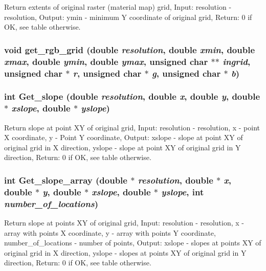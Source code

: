 Return extents of original raster (material map) grid, Input: resolution - resolution, Output: ymin - minimum Y coordinate of original grid, Return: 0 if OK, see table otherwise. 

\hypertarget{GisApi_8C_a18}{
\subsubsection[get\_\-rgb\_\-grid]{\setlength{\rightskip}{0pt plus 5cm}void get\_\-rgb\_\-grid (double {\em resolution}, double {\em xmin}, double {\em xmax}, double {\em ymin}, double {\em ymax}, unsigned char $\ast$$\ast$ {\em ingrid}, unsigned char $\ast$ {\em r}, unsigned char $\ast$ {\em g}, unsigned char $\ast$ {\em b})}}
\label{GisApi_8C_a18}


\hypertarget{GisApi_8C_a71}{
\subsubsection[Get\_\-slope]{\setlength{\rightskip}{0pt plus 5cm}int Get\_\-slope (double {\em resolution}, double {\em x}, double {\em y}, double $\ast$ {\em xslope}, double $\ast$ {\em yslope})}}
\label{GisApi_8C_a71}


Return slope at point XY of original grid, Input: resolution - resolution, x - point X coordinate, y - Point Y coordinate, Output: xslope - slope at point XY of original grid in X direction, yslope - slope at point XY of original grid in Y direction, Return: 0 if OK, see table otherwise. 

\hypertarget{GisApi_8C_a76}{
\subsubsection[Get\_\-slope\_\-array]{\setlength{\rightskip}{0pt plus 5cm}int Get\_\-slope\_\-array (double $\ast$ {\em resolution}, double $\ast$ {\em x}, double $\ast$ {\em y}, double $\ast$ {\em xslope}, double $\ast$ {\em yslope}, int {\em number\_\-of\_\-locations})}}
\label{GisApi_8C_a76}


Return slope at points XY of original grid, Input: resolution - resolution, x - array with points X coordinate, y - array with points Y coordinate, number\_\-of\_\-locations - number of points, Output: xslope - slopes at points XY of original grid in X direction, yslope - slopes at points XY of original grid in Y direction, Return: 0 if OK, see table otherwise. 

